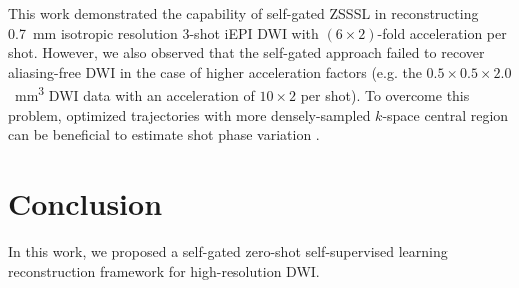 \documentclass[journal,twoside,web]{ieeecolor}
\begin{document}
	This work demonstrated the capability of self-gated ZSSSL in
	reconstructing \SI{0.7}{mm} isotropic resolution 3-shot iEPI DWI
	with $(6 \times 2)$-fold acceleration per shot.
	However, we also observed that the self-gated approach
	failed to recover aliasing-free DWI
	in the case of higher acceleration factors
	(e.g. the $0.5\times0.5\times2.0$~\si{mm^3} DWI data
	with an acceleration of $10\times2$ per shot).
	To overcome this problem, optimized trajectories
	with more densely-sampled $k$-space central region
	can be beneficial to estimate shot phase variation \cite{dai_2023_epti-diff}.

	\section{Conclusion}

	In this work, we proposed a self-gated zero-shot self-supervised learning
	reconstruction framework for high-resolution DWI.




	
	
\end{document}
